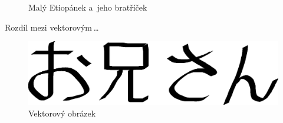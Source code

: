 \documentclass[a4paper,11pt]{article}
\begin{document}
\begin{figure}[h]
\begin{center}
    
    \caption{Malý Etiopánek a~jeho bratříček}
    \label{figure:etiop}
    \end{center}

\end{figure}

Rozdíl mezi vektorovým\,\dots

\begin{figure}[h]
    \begin{center}

	\includegraphics[scale=0.4]{images/oniisan.eps}
	
	\caption{Vektorový obrázek}
	\label{figure:vektorobr}
	    
\end{center}
\end{figure}
\end{document}
